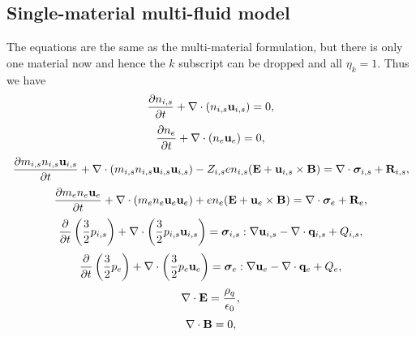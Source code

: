 \documentclass[a4paper,11pt]{report}
\begin{document}
\subsection{Single-material multi-fluid model}
\label{sec:mf_np1fluid_equations}
The equations are the same as the multi-material formulation, but there is only one material now and hence the $k$ subscript can be dropped and all $\eta_k = 1$. Thus we have 
\begin{equation}
    \label{eq:mf_np1fluid_ni}
    \frac{\partial n_{i,s}}{\partial t} + \nabla \cdot \left ( n_{i,s} \mathbf{u}_{i,s} \right ) = 0,
\end{equation}
\begin{equation}
    \label{eq:mf_np1fluid_ne}
    \frac{\partial n_e}{\partial t} + \nabla \cdot \left ( n_e \mathbf{u}_e \right ) = 0,
\end{equation}
\begin{equation}
    \label{eq:mf_np1fluid_ui}
    \frac{\partial m_{i,s} n_{i,s} \mathbf{u}_{i,s}}{\partial t} + \nabla \cdot \left( m_{i,s} n_{i,s} \mathbf{u}_{i,s} \mathbf{u}_{i,s} \right) - Z_{i,s} e n_{i,s} ( \mathbf{E} + \mathbf{u}_{i,s} \times \mathbf{B} ) = \nabla \cdot \bm \sigma_{i,s} + \mathbf{R}_{i,s},
\end{equation}
\begin{equation}
    \label{eq:mf_np1fluid_ue}
    \frac{\partial m_e n_e \mathbf{u}_e}{\partial t} + \nabla \cdot \left ( m_e n_e \mathbf{u}_e \mathbf{u}_e \right) + e n_e ( \mathbf{E} + \mathbf{u}_e \times \mathbf{B} ) = \nabla \cdot \bm \sigma_e + \mathbf{R}_e,
\end{equation}
\begin{equation}
    \label{eq:mf_np1fluid_iei}
    \frac{\partial}{\partial t} \left ( \frac{3}{2} p_{i,s} \right ) + \nabla \cdot \left ( \frac{3}{2} p_{i,s} \mathbf{u}_{i,s} \right ) = \bm \sigma_{i,s} : \nabla \mathbf{u}_{i,s} - \nabla \cdot \mathbf{q}_{i,s} + Q_{i,s},
\end{equation}
\begin{equation}
    \label{eq:mf_np1fluid_iee}
    \frac{\partial}{\partial t} \left ( \frac{3}{2} p_e \right ) + \nabla \cdot \left ( \frac{3}{2} p_e \mathbf{u}_e \right ) = \bm \sigma_e : \nabla \mathbf{u}_e - \nabla \cdot \mathbf{q}_e + Q_e,
\end{equation}
\begin{equation}
    \label{eq:mf_np1fluid_maxwell_3}
    \nabla \cdot \mathbf{E} = \frac{\rho_q}{\epsilon_0},
\end{equation}
\begin{equation}
    \label{eq:mf_np1fluid_maxwell_4}
    \nabla \cdot \mathbf{B} = 0,
\end{equation}
\end{document}
